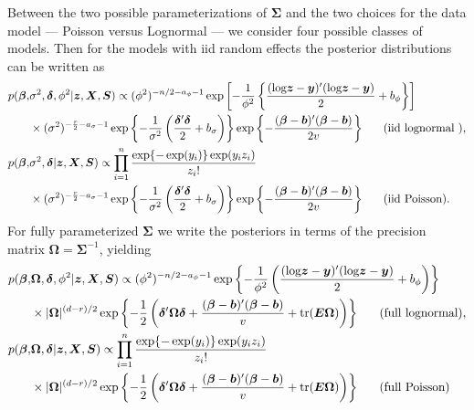 \documentclass[12pt]{article}
\def\log{\hbox{log}}
\begin{document}
Between the two possible parameterizations of $\bm{\Sigma}$ and the two choices for the data model --- Poisson versus Lognormal --- we consider four possible classes of models. Then for the models with iid random effects the posterior distributions can be written as
\begin{align}
p(\bm{\beta},& \sigma^2, \bm{\delta}, \phi^2|\bm{z}, \bm{X}, \bm{S}) \propto (\phi^2)^{-n/2 - a_\phi - 1}\exp\left[-\frac{1}{\phi^2}\left\{\frac{(\log\bm{z} - \bm{y})'(\log\bm{z} - \bm{y})}{2} + b_\phi\right\}\right] \nonumber\\
&\times (\sigma^2)^{-\frac{r}{2} - a_{\sigma}-1}\exp\left\{-\frac{1}{\sigma^2}\left(\frac{\bm{\delta}'\bm{\delta}}{2} + b_{\sigma}\right)\right\}\exp\left\{-\frac{(\bm{\beta} - \bm{b})'(\bm{\beta} - \bm{b})}{2v}\right\}\mbox{\ \ \ \ \ (iid lognormal ),}\label{eq:iidnormpost}\\
p(\bm{\beta},& \sigma^2, \bm{\delta}|\bm{z}, \bm{X}, \bm{S}) \propto \prod_{i=1}^n \frac{\exp\{-\exp(y_i)\}\exp(y_iz_i)}{z_i!}  \nonumber\\
&\times (\sigma^2)^{-\frac{r}{2} - a_{\sigma}-1}\exp\left\{-\frac{1}{\sigma^2}\left(\frac{\bm{\delta}'\bm{\delta}}{2} + b_{\sigma}\right)\right\}\exp\left\{-\frac{(\bm{\beta} - \bm{b})'(\bm{\beta} - \bm{b})}{2v}\right\}\mbox{\ \ \ \ \ (iid Poisson).}\label{eq:iidpoispost}
\end{align}
For fully parameterized $\bm{\Sigma}$ we write the posteriors in terms of the precision matrix $\bm{\Omega} = \bm{\Sigma}^{-1}$, yielding
\begin{align}
p(\bm{\beta},& \bm{\Omega}, \bm{\delta}, \phi^2|\bm{z}, \bm{X}, \bm{S}) \propto (\phi^2)^{-n/2 - a_\phi - 1}\exp\left\{-\frac{1}{\phi^2}\left(\frac{(\log\bm{z} - \bm{y})'(\log\bm{z} - \bm{y})}{2} + b_\phi\right)\right\} \nonumber\\
&\times |\bm{\Omega}|^{(d - r)/2}\exp\left\{-\frac{1}{2}\left(\bm{\delta}'\bm{\Omega}\bm{\delta}+\frac{(\bm{\beta} - \bm{b})'(\bm{\beta} - \bm{b})}{v} + \mathrm{tr}(\bm{E}\bm{\Omega})\right)\right\}\mbox{\ \ \ \ \ (full lognormal),}\label{eq:fullnormpostprec}\\
p(\bm{\beta},& \bm{\Omega}, \bm{\delta}|\bm{z}, \bm{X}, \bm{S}) \propto \prod_{i=1}^n \frac{\exp\{-\exp(y_i)\}\exp(y_iz_i)}{z_i!}  \nonumber\\
&\times |\bm{\Omega}|^{(d - r)/2}\exp\left\{-\frac{1}{2}\left(\bm{\delta}'\bm{\Omega}\bm{\delta}+\frac{(\bm{\beta} - \bm{b})'(\bm{\beta} - \bm{b})}{v} + \mathrm{tr}(\bm{E}\bm{\Omega})\right)\right\}\mbox{\ \ \ \ \ (full Poisson)}\label{eq:fullpoispostprec}
\end{align}
\end{document}
